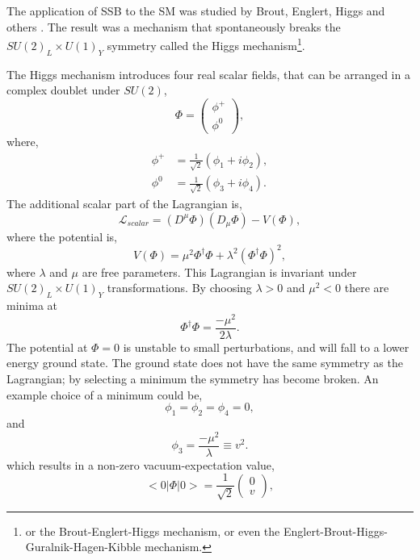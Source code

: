The application of {SSB} to the {SM} was studied by Brout, Englert, Higgs
and others \cite{higgs1981broken, englert1964broken, guralnik1964global}.
The result was a mechanism that spontaneously breaks the
 $SU(2)_{L} \times U(1)_{Y}$ symmetry called the Higgs mechanism\footnote{or the
Brout-Englert-Higgs mechanism, or even the
Englert-Brout-Higgs-Guralnik-Hagen-Kibble mechanism.}.

The Higgs mechanism introduces four real scalar fields, that can be arranged in
a complex doublet under $SU(2)$,
\begin{equation}
\Phi = \left( \begin{matrix} \phi^{+} \\ \phi^{0} \end{matrix} \right),
\end{equation}
where,
\begin{align*}
\phi^{+} &=\frac{1}{\sqrt{2}} (\phi_{1} + i \phi_{2}),\\
\phi^{0} &=\frac{1}{\sqrt{2}} (\phi_{3} + i \phi_{4}).
\end{align*}
The additional scalar part of the Lagrangian is,
\begin{equation}
\mathcal{L}_{scalar} = 
\left(D^{\mu}\Phi\right) \left(D_{\mu}\Phi\right) - V(\Phi),
\end{equation}
where the potential is,
\begin{equation}
V(\Phi) = 
\mu^{2}\Phi^{\dagger}\Phi + 
\lambda^{2} \left( \Phi^{\dagger} \Phi \right)^{2},
\end{equation}
where $\lambda$ and $\mu$ are free parameters. This Lagrangian is invariant
under $SU(2)_{L} \times U(1)_{Y}$ transformations.
By choosing  $\lambda>0$ and
$\mu^{2}<0$ there are minima at
\begin{equation}
\Phi^{\dagger} \Phi = \frac{- \mu^{2}}{2 \lambda}.
\end{equation}
The potential at $\Phi=0$ is unstable to small perturbations, and will fall
to a lower energy ground state. 
The ground state does not have the same symmetry as the Lagrangian; by
selecting a minimum the symmetry has become broken. An example choice of a minimum
could be,
\begin{equation}
\phi_{1} = \phi_{2} = \phi_{4} = 0,
\end{equation}
and
\begin{equation}
\phi_{3} = \frac{-\mu^{2}}{\lambda} \equiv v^{2}.
\end{equation}
which results in a non-zero vacuum-expectation value,
\begin{equation}
<0|\Phi|0> = \frac{1}{\sqrt{2}}\left(\begin{matrix}0\\v\end{matrix}\right),
\end{equation}
